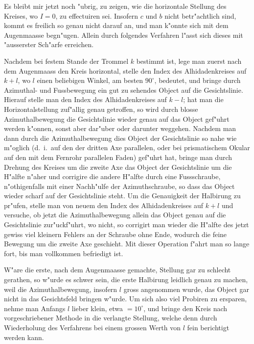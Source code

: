 \documentclass[12pt,a4paper]{article}
\begin{document}
Es bleibt mir jetzt noch "ubrig, zu zeigen, wie die horizontale Stellung des Kreises, wo $I = 0$,
zu effectuiren sei. Insofern $c$ und $b$ nicht betr"achtlich sind, kommt es freilich so genau nicht darauf
an, und man k"onnte sich mit dem Augenmaasse begn"ugen. Allein durch folgendes Verfahren l"asst sich
dieses mit "ausserster Sch"arfe erreichen.

Nachdem bei festem Stande der Trommel $k$ bestimmt ist, lege man zuerst nach dem Augenmaass
den Kreis horizontal, stelle den Index des Alhidadenkreises auf $k + l$, wo $l$ einen beliebigen Winkel,
am besten $90^{\circ}$, bedeutet, und bringe durch Azimuthal- und Fussbewegung ein gut zu sehendes Object
auf die Gesichtslinie. Hierauf stelle man den Index des Alhidadenkreises auf $k - l$; hat man die Horizontalstellung
zuf"allig genau getroffen, so wird durch blosse Azimuthalbewegung die Gesichtslinie wieder
genau auf das Object gef"uhrt werden k"onnen, sonst aber dar"uber oder darunter weggehen. Nachdem
man dann durch die Azimuthalbewegung dies Object der Gesichtslinie so nahe wie m"oglich (d.~i.~auf
den der dritten Axe parallelen, oder bei prismatischem Okular auf den mit dem Fernrohr parallelen
Faden) gef"uhrt hat, bringe man durch Drehung des Kreises um die zweite Axe das Object der Gesichtslinie
um die H"alfte n"aher und corrigire die andere H"alfte durch eine Fussschraube, n"othigenfalls mit einer
Nachh"ulfe der Azimuthschraube, so dass das Object wieder scharf auf der Gesichtslinie steht. Um die
Genauigkeit der Halbirung zu pr"ufen, stelle man von neuem den Index des Alhidadenkreises auf $k + l$
und versuche, ob jetzt die Azimuthalbewegung allein das Object genau auf die Gesichtslinie zur"uckf"uhrt,
wo nicht, so corrigirt man wieder die H"alfte des jetzt gewiss viel kleinern Fehlers an der Schraube
ohne Ende, wodurch die feine Bewegung um die zweite Axe geschieht. Mit dieser Operation f"ahrt man
so lange fort, bis man vollkommen befriedigt ist.

W"are die erste, nach dem Augenmaasse gemachte, Stellung gar zu schlecht gerathen, so w"urde
es schwer sein, die erste Halbirung leidlich genau zu machen, weil die Azimuthalbewegung, insofern $l$
gross angenommen wurde, das Object gar nicht in das Gesichtsfeld bringen w"urde. Um sich also viel
Probiren zu ersparen, nehme man Anfangs $l$ lieber klein, etwa $= 10^{\circ}$, und bringe den Kreis nach
vorgeschriebener Methode in die verlangte Stellung, welche denn durch Wiederholung des Verfahrens
bei einem grossen Werth von $l$ fein berichtigt werden kann.
\end{document}
